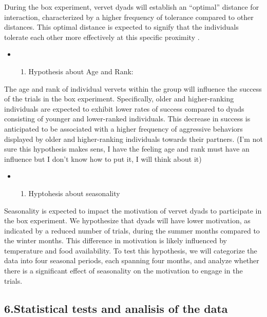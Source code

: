 \documentclass[
]{article}
\providecommand{\tightlist}{%
  \setlength{\itemsep}{0pt}\setlength{\parskip}{0pt}}
\begin{document}
During the box experiment, vervet dyads will establish an ``optimal''
distance for interaction, characterized by a higher frequency of
tolerance compared to other distances. This optimal distance is expected
to signify that the individuals tolerate each other more effectively at
this specific proximity .

\begin{itemize}
\item
  \begin{enumerate}
  \def\labelenumi{\arabic{enumi}.}
  \setcounter{enumi}{3}
  \tightlist
  \item
    Hypothesis about Age and Rank:
  \end{enumerate}
\end{itemize}

The age and rank of individual vervets within the group will influence
the success of the trials in the box experiment. Specifically, older and
higher-ranking individuals are expected to exhibit lower rates of
success compared to dyads consisting of younger and lower-ranked
individuals. This decrease in success is anticipated to be associated
with a higher frequency of aggressive behaviors displayed by older and
higher-ranking individuals towards their partners. (I'm not sure this
hypothesis makes sens, I have the feeling age and rank must have an
influence but I don't know how to put it, I will think about it)

\begin{itemize}
\item
  \begin{enumerate}
  \def\labelenumi{\arabic{enumi}.}
  \setcounter{enumi}{4}
  \tightlist
  \item
    Hyptohesis about seasonality
  \end{enumerate}
\end{itemize}

Seasonality is expected to impact the motivation of vervet dyads to
participate in the box experiment. We hypothesize that dyads will have
lower motivation, as indicated by a reduced number of trials, during the
summer months compared to the winter months. This difference in
motivation is likely influenced by temperature and food availability. To
test this hypothesis, we will categorize the data into four seasonal
periods, each spanning four months, and analyze whether there is a
significant effect of seasonality on the motivation to engage in the
trials.

\hypertarget{statistical-tests-and-analisis-of-the-data}{%
\subsection{6.Statistical tests and analisis of the
data}\label{statistical-tests-and-analisis-of-the-data}}
\end{document}
